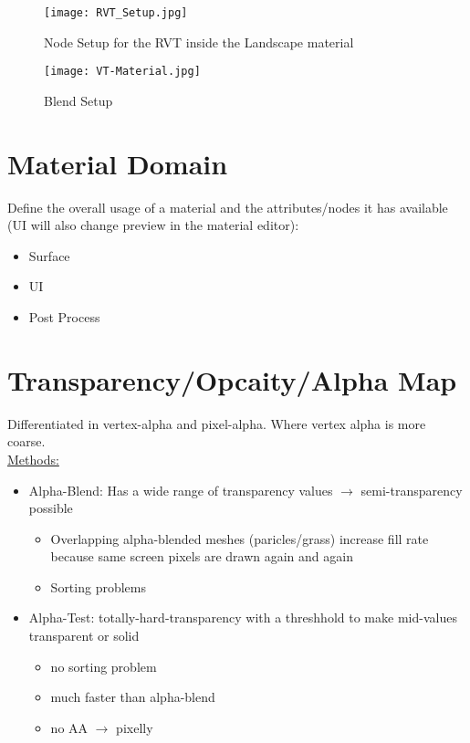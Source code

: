             \begin{figure}
                \texttt{[image: RVT\_Setup.jpg]}
                \caption{Node Setup for the RVT inside the Landscape material}
            \end{figure}

            \begin{figure}
                \texttt{[image: VT-Material.jpg]}
                \caption{Blend Setup}
            \end{figure}

    \section{Material Domain}
        Define the overall usage of a material and the attributes/nodes it has available (UI will also change preview in the material editor):
        \begin{itemize}
            \item Surface
            \item UI
            \item Post Process
        \end{itemize}

    \section{Transparency/Opcaity/Alpha Map}
        Differentiated in vertex-alpha and pixel-alpha. Where vertex alpha is more coarse. \\
        \underline{Methods:}
        \begin{itemize}
            \item Alpha-Blend: Has a wide range of transparency values $\rightarrow$ semi-transparency possible
            \begin{itemize}
                \item Overlapping alpha-blended meshes (paricles/grass) increase fill rate because same screen pixels are drawn again and again
                \item Sorting problems
            \end{itemize}
            \item Alpha-Test: totally-hard-transparency with a threshhold to make mid-values transparent or solid
            \begin{itemize}
                \item no sorting problem
                \item much faster than alpha-blend
                \item no AA $\rightarrow$ pixelly
            \end{itemize}
        \end{itemize}

